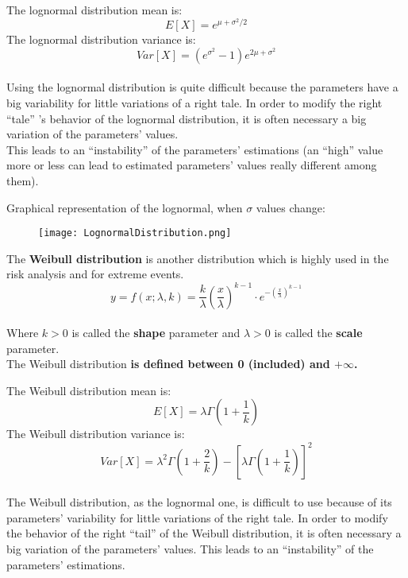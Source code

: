 \begin{frame}
  The lognormal distribution mean is:
  $$ E[X] = e^{\mu + \sigma^2/2} $$
  The lognormal distribution variance is:
  $$ Var[X] = (e^{\sigma^2} - 1) e^{2 \mu + \sigma^2}$$\\
  Using the lognormal distribution is quite difficult because the parameters have a big variability for little variations of a right tale. In order to modify the right ``tale'' 's behavior of the lognormal distribution, it is often necessary a big variation of the parameters' values.\\
  This leads to an ``instability'' of the parameters' estimations (an ``high'' value more or less can lead to estimated parameters' values really different among them).
\end{frame}

\begin{frame}
  \vspace*{.5cm}
  \centering
  Graphical representation of the lognormal, when $ \sigma $ values change: \\
  \begin{figure}
    \texttt{[image: LognormalDistribution.png]}
  \end{figure}
\end{frame}


\begin{frame}
  \vspace*{.5cm}
  The \textbf{Weibull distribution} is another distribution which is highly used in the risk analysis and for extreme events.\\
  \vspace*{.5cm}
  $$ y = f(x; \lambda, k) = \frac{k}{\lambda}\left( \frac{x}{\lambda}\right)^{k-1} \cdot e^{-\left(\frac{x}{\lambda} \right)^{k-1}} $$ \\
  \vspace*{.75cm}
  Where $ k > 0 $ is called the \textbf{shape} parameter and $ \lambda > 0 $ is called the \textbf{scale} parameter. \\
  \vspace*{.75cm}
  The Weibull distribution \textbf{is defined between 0 (included) and {\boldmath $ +\infty $}.} \\
\end{frame}

\begin{frame}
  The Weibull distribution mean is:
  $$ E[X] = \lambda \Gamma \left( 1 + \frac{1}{k} \right) $$
  The Weibull distribution variance is:
  $$ Var[X] = \lambda^2 \Gamma \left( 1 + \frac{2}{k} \right) - \left[ \lambda \Gamma \left( 1 + \frac{1}{k} \right) \right]^2 $$ \\
  The Weibull distribution, as the lognormal one, is difficult to use because of its parameters' variability for little variations of the right tale. In order to modify the behavior of the right ``tail'' of the Weibull distribution, it is often necessary a big variation of the parameters' values. This leads to an ``instability'' of the parameters' estimations.
\end{frame}

